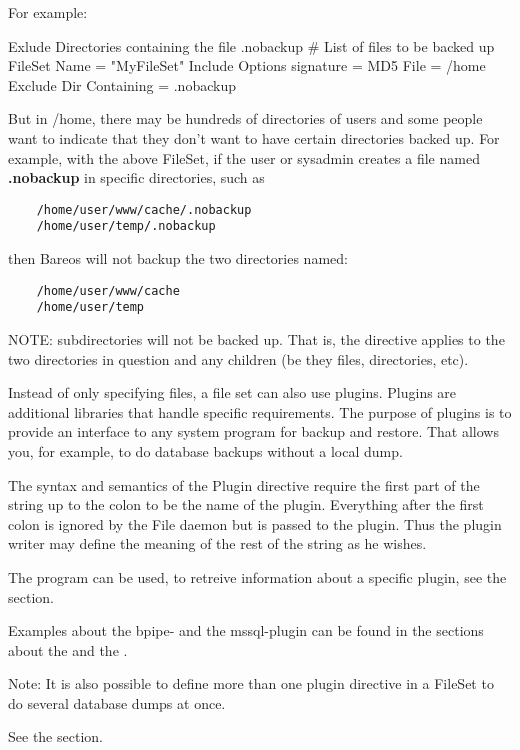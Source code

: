 \begin{description}
    For example:

    \begin{bconfig}{Exlude Directories containing the file .nobackup}
    # List of files to be backed up
    FileSet {
        Name = "MyFileSet"
        Include {
            Options {
                signature = MD5
            }
            File = /home
            Exclude Dir Containing = .nobackup
        }
    }
    \end{bconfig}

    But in /home, there may be hundreds of directories of users and some
    people want to indicate that they don't want to have certain
    directories backed up. For example, with the above FileSet, if
    the user or sysadmin creates a file named {\bf .nobackup} in
    specific directories, such as

    \begin{verbatim}
    /home/user/www/cache/.nobackup
    /home/user/temp/.nobackup
    \end{verbatim}

    then Bareos will not backup the two directories named:

    \begin{verbatim}
    /home/user/www/cache
    /home/user/temp
    \end{verbatim}

    NOTE: subdirectories will not be backed up.  That is, the directive
    applies to the two directories in question and any children (be they
    files, directories, etc).


\label{directive-fileset-plugin}
        Instead of only specifying files, a file set can also use plugins.
        Plugins are additional libraries that handle specific requirements.
        The purpose of plugins is to provide an interface to any system program
        for backup and restore. That allows you, for example, to do database backups without a local dump.

        The syntax and semantics of the Plugin directive require 
        the first part of the string up to the colon to be the name of the plugin.
        Everything after the first colon is ignored by the File daemon but is passed to the plugin. 
        Thus the plugin writer may define the 
        meaning of the rest of the string as he wishes.

        The program  can be used, to retreive information about a specific plugin, see the   section.

        Examples about the bpipe- and the mssql-plugin can be found in the sections about the  and the .

        Note: It is also possible to define more than one plugin directive in a FileSet to do several database dumps at once.

    See the  section.

\end{description}


